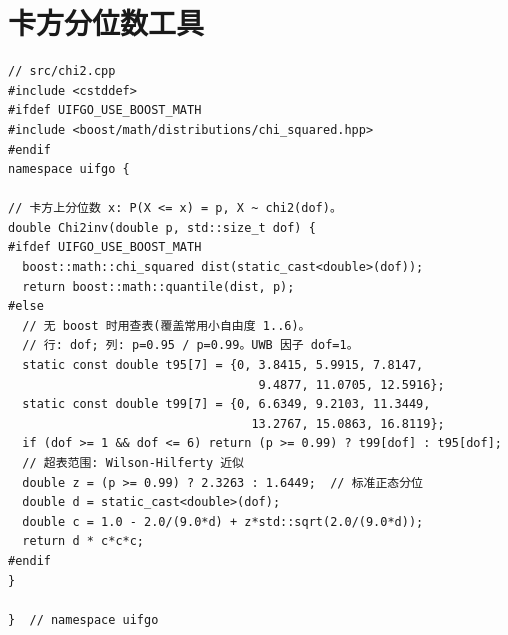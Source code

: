 \documentclass[11pt,a4paper]{report}
\begin{document}
\section{卡方分位数工具}
\begin{lstlisting}[style=cpp]
// src/chi2.cpp
#include <cstddef>
#ifdef UIFGO_USE_BOOST_MATH
#include <boost/math/distributions/chi_squared.hpp>
#endif
namespace uifgo {

// 卡方上分位数 x: P(X <= x) = p, X ~ chi2(dof)。
double Chi2inv(double p, std::size_t dof) {
#ifdef UIFGO_USE_BOOST_MATH
  boost::math::chi_squared dist(static_cast<double>(dof));
  return boost::math::quantile(dist, p);
#else
  // 无 boost 时用查表(覆盖常用小自由度 1..6)。
  // 行: dof; 列: p=0.95 / p=0.99。UWB 因子 dof=1。
  static const double t95[7] = {0, 3.8415, 5.9915, 7.8147,
                                   9.4877, 11.0705, 12.5916};
  static const double t99[7] = {0, 6.6349, 9.2103, 11.3449,
                                  13.2767, 15.0863, 16.8119};
  if (dof >= 1 && dof <= 6) return (p >= 0.99) ? t99[dof] : t95[dof];
  // 超表范围: Wilson-Hilferty 近似
  double z = (p >= 0.99) ? 2.3263 : 1.6449;  // 标准正态分位
  double d = static_cast<double>(dof);
  double c = 1.0 - 2.0/(9.0*d) + z*std::sqrt(2.0/(9.0*d));
  return d * c*c*c;
#endif
}

}  // namespace uifgo
\end{lstlisting}
\end{document}
